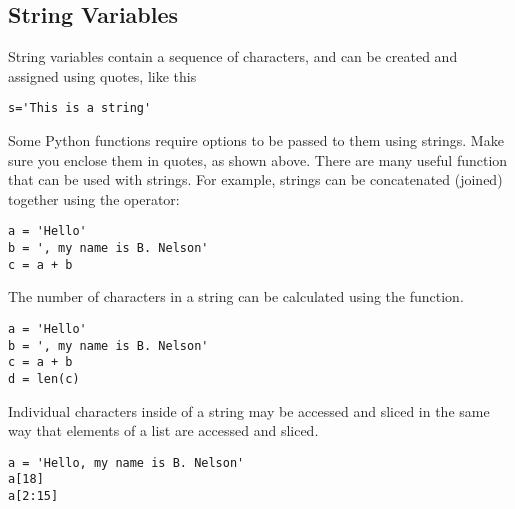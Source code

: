 \subsection*{String Variables}
 String variables contain a sequence of characters, and
can be created and assigned using quotes, like this
\begin{Verbatim}
s='This is a string'
\end{Verbatim}
Some Python functions require options to be passed to them using
strings. Make sure you enclose them in quotes, as shown
above.  There are many useful function that can be used with strings.
For example, strings can be concatenated (joined) together using the
\code{+} operator:
\begin{Verbatim}
a = 'Hello'
b = ', my name is B. Nelson'
c = a + b
\end{Verbatim}
The number of characters in a string can be calculated using the
 function.
\begin{Verbatim}
a = 'Hello'
b = ', my name is B. Nelson'
c = a + b
d = len(c)
\end{Verbatim}
Individual characters inside of a string may be accessed  and sliced
in the same way that elements of a list are accessed and sliced.
\begin{Verbatim}
a = 'Hello, my name is B. Nelson'
a[18]
a[2:15]
\end{Verbatim}
